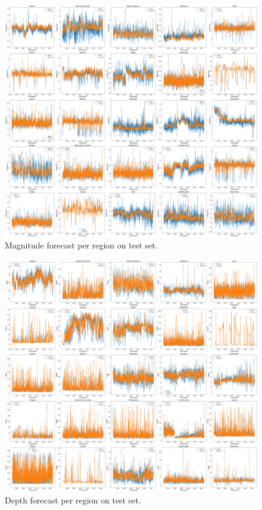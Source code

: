 \begin{figure}[hbtp]
    \centering
    \includegraphics[scale=0.15]{img/magnitude-forecast-test-set.png}
    \captionsetup{format=hang}
    \caption{\label{fig:mag-forecast-full}Magnitude forecast per region on test set.}
\end{figure}

\begin{figure}[hbtp]
    \centering
    \includegraphics[scale=0.15]{img/depth-forecast-test-set.png}
    \captionsetup{format=hang}
    \caption{\label{fig:depth-forecast-full}Depth forecast per region on test set.}
\end{figure}